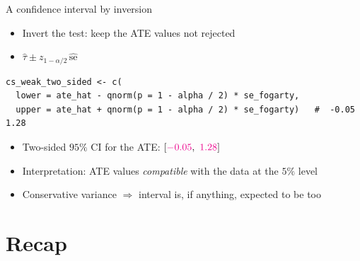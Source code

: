 \documentclass[table, xcolor = {dvipsnames}, 9pt]{beamer}
\theoremstyle{plain}
\newcommand{\mh}[1]{{\color{magenta}{#1}}}
\begin{document}
\begin{frame}[fragile, label=weakci]{A confidence interval by inversion}
\vfill
\begin{itemize} \vfill
\item Invert the test: keep the ATE values not rejected \vfill
\item[] $\hat{\tau} \pm z_{1-\alpha/2}\,\widehat{\text{se}}$ \vfill
\end{itemize}
\begin{lstlisting}[style=Rstyle, basicstyle=\ttfamily\tiny, frame=single]
cs_weak_two_sided <- c(
  lower = ate_hat - qnorm(p = 1 - alpha / 2) * se_fogarty,
  upper = ate_hat + qnorm(p = 1 - alpha / 2) * se_fogarty)   #  -0.05   1.28
\end{lstlisting}
\begin{itemize} \vfill
\item Two-sided $95\%$ CI for the ATE: $[\mh{-0.05},\ \mh{1.28}]$ \vfill
\item Interpretation: ATE values \emph{compatible} with the data at the $5\%$ level \vfill
\item Conservative variance $\Rightarrow$ interval is, if anything, expected to be too \mh{wide} \vfill
\end{itemize} \vfill
\end{frame}
\section{Recap}
\end{document}
